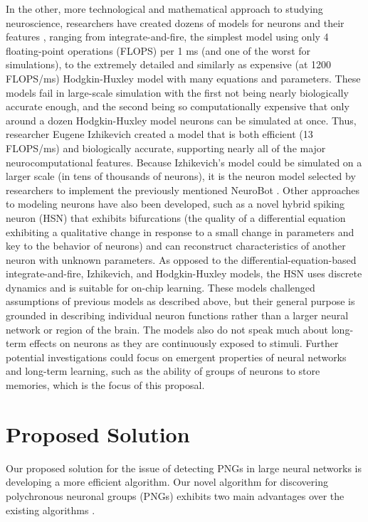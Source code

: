 \documentclass{sigchi}
\begin{document}
In the other, more technological and mathematical approach to studying neuroscience, researchers have created dozens of models for neurons and their features \cite{whichmodel, modelsofsr}, ranging from integrate-and-fire, the simplest model using only 4 floating-point operations (FLOPS) per 1 ms (and one of the worst for simulations), to the extremely detailed and similarly as expensive (at 1200 FLOPS/ms) Hodgkin-Huxley model \cite{hodgkinquantitative} with many equations and parameters. These models fail in large-scale simulation with the first not being nearly biologically accurate enough, and the second being so computationally expensive that only around a dozen Hodgkin-Huxley model neurons can be simulated at once. Thus, researcher Eugene Izhikevich created a model \cite{simplemodel} that is both efficient (13 FLOPS/ms) and biologically accurate, supporting nearly all of the major neurocomputational features. Because Izhikevich's model could be simulated on a larger scale (in tens of thousands of neurons), it is the neuron model selected by researchers to implement the previously mentioned NeuroBot \cite{neurobot}. Other approaches to modeling neurons have also been developed, such as a novel hybrid spiking neuron (HSN) \cite{novelhybrid} that exhibits bifurcations (the quality of a differential equation exhibiting a qualitative change in response to a small change in parameters and key to the behavior of neurons) and can reconstruct characteristics of another neuron with unknown parameters. As opposed to the differential-equation-based integrate-and-fire, Izhikevich, and Hodgkin-Huxley models, the HSN uses discrete dynamics and is suitable for on-chip learning. These models challenged assumptions of previous models as described above, but their general purpose is grounded in describing individual neuron functions rather than a larger neural network or region of the brain. The models also do not speak much about long-term effects on neurons as they are continuously exposed to stimuli. Further potential investigations could focus on emergent properties of neural networks and long-term learning, such as the ability of groups of neurons to store memories, which is the focus of this proposal.\\
\section{Proposed Solution}
Our proposed solution for the issue of detecting PNGs in large neural networks is developing a more efficient algorithm. Our novel algorithm for discovering polychronous neuronal groups (PNGs) exhibits two main advantages over the existing algorithms \cite{pngalgo}.
\end{document}
